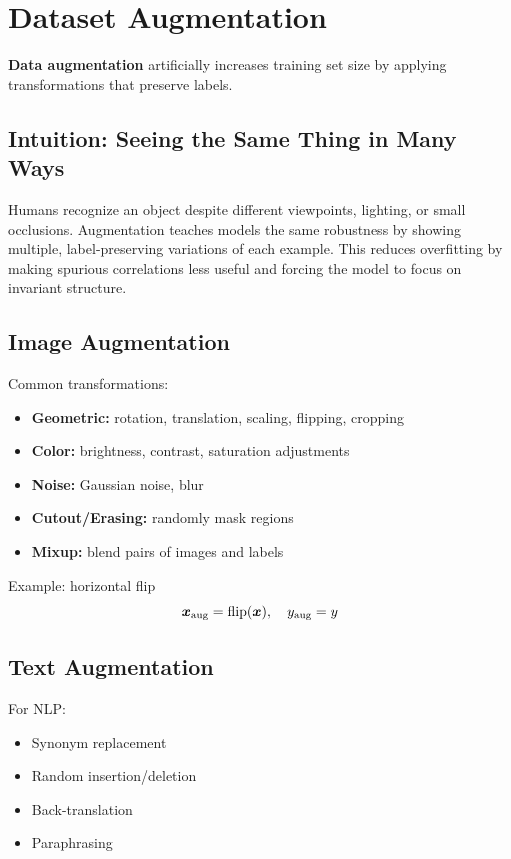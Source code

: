 
\section{Dataset Augmentation}
\label{sec:data-augmentation}

\textbf{Data augmentation} artificially increases training set size by applying transformations that preserve labels.

\subsection{Intuition: Seeing the Same Thing in Many Ways}

Humans recognize an object despite different viewpoints, lighting, or small occlusions. Augmentation teaches models the same robustness by showing multiple, label-preserving variations of each example. This reduces overfitting by making spurious correlations less useful and forcing the model to focus on invariant structure.

\subsection{Image Augmentation}

Common transformations:
\begin{itemize}
    \item \textbf{Geometric:} rotation, translation, scaling, flipping, cropping
    \item \textbf{Color:} brightness, contrast, saturation adjustments
    \item \textbf{Noise:} Gaussian noise, blur
    \item \textbf{Cutout/Erasing:} randomly mask regions
    \item \textbf{Mixup:} blend pairs of images and labels
\end{itemize}

Example: horizontal flip
\begin{equation}
\boldsymbol{x}_{\text{aug}} = \text{flip}(\boldsymbol{x}), \quad y_{\text{aug}} = y
\end{equation}

\subsection{Text Augmentation}

For NLP:
\begin{itemize}
    \item Synonym replacement
    \item Random insertion/deletion
    \item Back-translation
    \item Paraphrasing
\end{itemize}

